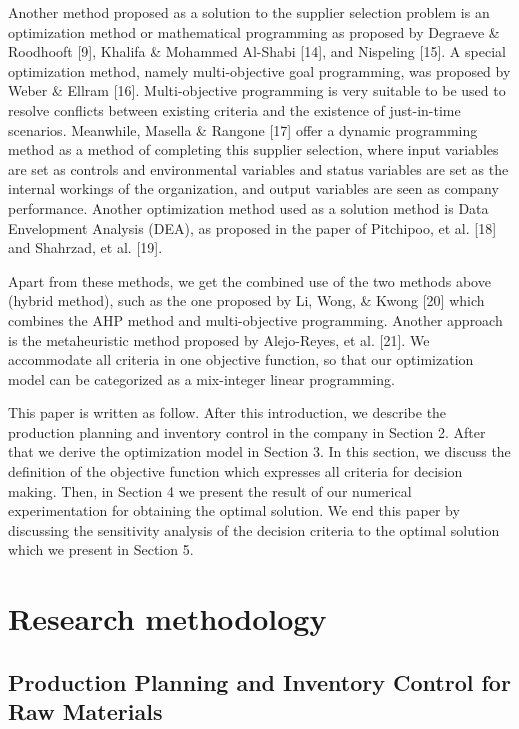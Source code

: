 \documentclass[preprint, 3p,
authoryear]{elsarticle} %
\begin{document}
Another method proposed as a solution to the supplier selection problem
is an optimization method or mathematical programming as proposed by
Degraeve \& Roodhooft {[}9{]}, Khalifa \& Mohammed Al-Shabi {[}14{]},
and Nispeling {[}15{]}. A special optimization method, namely
multi-objective goal programming, was proposed by Weber \& Ellram
{[}16{]}. Multi-objective programming is very suitable to be used to
resolve conflicts between existing criteria and the existence of
just-in-time scenarios. Meanwhile, Masella \& Rangone {[}17{]} offer a
dynamic programming method as a method of completing this supplier
selection, where input variables are set as controls and environmental
variables and status variables are set as the internal workings of the
organization, and output variables are seen as company performance.
Another optimization method used as a solution method is Data
Envelopment Analysis (DEA), as proposed in the paper of Pitchipoo, et
al. {[}18{]} and Shahrzad, et al. {[}19{]}.

Apart from these methods, we get the combined use of the two methods
above (hybrid method), such as the one proposed by Li, Wong, \& Kwong
{[}20{]} which combines the AHP method and multi-objective programming.
Another approach is the metaheuristic method proposed by Alejo-Reyes, et
al. {[}21{]}. We accommodate all criteria in one objective function, so
that our optimization model can be categorized as a mix-integer linear
programming.

This paper is written as follow. After this introduction, we describe
the production planning and inventory control in the company in Section
2. After that we derive the optimization model in Section 3. In this
section, we discuss the definition of the objective function which
expresses all criteria for decision making. Then, in Section 4 we
present the result of our numerical experimentation for obtaining the
optimal solution. We end this paper by discussing the sensitivity
analysis of the decision criteria to the optimal solution which we
present in Section 5.

\hypertarget{research-methodology}{%
\section{Research methodology}\label{research-methodology}}

\hypertarget{production-planning-and-inventory-control-for-raw-materials}{%
\subsection{Production Planning and Inventory Control for Raw
Materials}\label{production-planning-and-inventory-control-for-raw-materials}}
\end{document}
